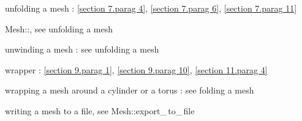 \documentclass[a4paper,oneside]{scrbook}
\def\numb{}
\newcommand\verm[1]{\textcolor{manif}{#1}}
\renewcommand\tt{\normalfont\ttfamily}
\begin{document}
\noindent
unfolding a mesh : \ref{\numb section 7.\numb parag 4}, \ref{\numb section 7.\numb parag 6},
\ref{\numb section 7.\numb parag 11}

\noindent
{\small\tt\verm{Mesh}::}, see unfolding a mesh

\noindent
unwinding a mesh : see unfolding a mesh

\noindent
wrapper : \ref{\numb section 9.\numb parag 1}, \ref{\numb section 9.\numb parag 10},
\ref{\numb section 11.\numb parag 4}

\noindent
wrapping a mesh around a cylinder or a torus : see folding a mesh

\noindent
writing a mesh to a file, see {\small\tt\verm{Mesh}::export\_\,to\_\,file}
\end{document}
